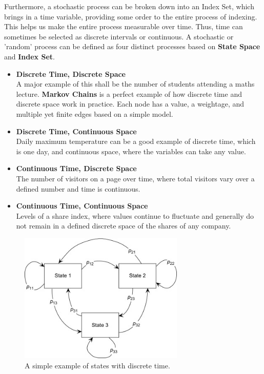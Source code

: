 Furthermore, a stochastic process can be broken down into an Index Set, which brings in a time variable, providing some order to the entire process of indexing. This helps us make the entire process measurable over time. Thus, time can sometimes be selected as discrete intervals or continuous. A stochastic or 'random' process can be defined as four distinct processes based on \textbf{State Space} and \textbf{Index Set}.

\begin{itemize}
    \item \textbf{Discrete Time, Discrete Space} \\
    A major example of this shall be the number of students attending a maths lecture.
    \textbf{Markov Chains} is a perfect example of how discrete time and discrete space work in practice. Each node has a value, a weightage, and multiple yet finite edges based on a simple model.
    \item \textbf{Discrete Time, Continuous Space} \\
    Daily maximum temperature can be a good example of discrete time, which is one day, and continuous space, where the variables can take any value.
    \item \textbf{Continuous Time, Discrete Space} \\
    The number of visitors on a page over time, where total visitors vary over a defined number and time is continuous.
    \item \textbf{Continuous Time, Continuous Space} \\
    Levels of a share index, where values continue to fluctuate and generally do not remain in a defined discrete space of the shares of any company.
\end{itemize}

\begin{figure}[H]
	\begin{center}
		\includegraphics[width = 0.7\textwidth]{Images/markov_chain.jpg} %
		\caption{A simple example of states with discrete time.}
		\label{fig:markov-chain-state-space}
	\end{center}
\end{figure}

